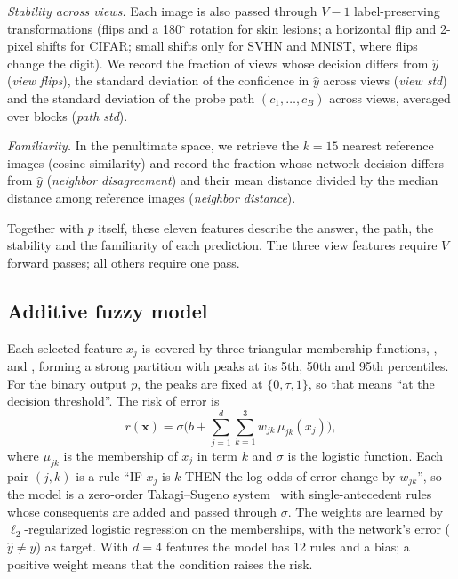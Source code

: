 \textit{Stability across views.}
Each image is also passed through $V-1$ label-preserving transformations (flips and a 180$^\circ$ rotation for skin lesions; a horizontal flip and
2-pixel shifts for CIFAR; small shifts only for SVHN and MNIST, where flips change the digit). We record the fraction of views whose decision differs from $\hat y$ (\textit{view flips}),
the standard deviation of the confidence in $\hat y$ across views (\textit{view std}) and the standard deviation of the probe path
$(c_1,\dots,c_B)$ across views, averaged over blocks (\textit{path std}).

\textit{Familiarity.}
In the penultimate space, we retrieve the $k=15$ nearest reference images (cosine similarity) and record the fraction whose network
decision differs from $\hat y$ (\textit{neighbor disagreement}) and their mean distance divided by the median distance among reference
images (\textit{neighbor distance}).

Together with $p$ itself, these eleven features describe the answer, the path, the stability and the familiarity of each prediction.
The three view features require $V$ forward passes; all others require one pass.

\subsection{Additive fuzzy model}
Each selected feature $x_j$ is covered by three triangular membership functions, ,  and , forming a strong
partition with peaks at its 5th, 50th and 95th percentiles. For the binary output $p$, the peaks are fixed at $\{0, \tau, 1\}$, so that
 means ``at the decision threshold''. The risk of error is
\begin{equation}
  r(\mathbf{x}) = \sigma\Big(b + \sum_{j=1}^{d}\sum_{k=1}^{3} w_{jk}\,\mu_{jk}(x_j)\Big),
  \label{eq:aditivo}
\end{equation}
where $\mu_{jk}$ is the membership of $x_j$ in term $k$ and $\sigma$ is the logistic function. Each pair $(j,k)$ is a rule
``IF $x_j$ is $k$ THEN the log-odds of error change by $w_{jk}$'', so the model is a zero-order Takagi--Sugeno system~\cite{takagi1985}
with single-antecedent rules whose consequents are added and passed through $\sigma$. The weights are learned by $\ell_2$-regularized
logistic regression on the memberships, with the network's error ($\hat y \ne y$) as target. With $d=4$ features the model has 12 rules
and a bias; a positive weight means that the condition raises the risk.

